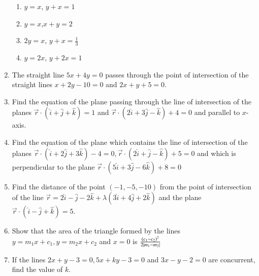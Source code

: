 \begin{enumerate}[label=\thesubsection.\arabic*,ref=\thesubsection.\theenumi]
\begin{enumerate}
\item $y=x$, $y+x=1$
\item $y=x$,$x+y=2$
\item $2y=x$, $y+x=\frac{1}{3}$
\item $y=2x$, $y+2x=1$
\end{enumerate}
\item The straight line $5x+4y=0$ passes through the point of intersection of the straight lines $x+2y-10=0$ and $2x+y+5=0$.
\item Find the equation of the plane passing through the line of intersection of the planes  $\overrightarrow{r}\cdot(\hat{i}+\hat{j}+\hat{k})=1$ and $\overrightarrow{r}\cdot(2\hat{i}+3\hat{j}-\hat{k})+4=0$ and parallel to $x$-axis.
\item Find the equation of the plane which contains the line of intersection of the planes $\overrightarrow{r}\cdot(\hat{i}+2\hat{j}+3\hat{k})-4=0, \overrightarrow{r} \cdot  (2\hat{i}+\hat{j}-\hat{k})+5=0$ and which is perpendicular to the plane $\overrightarrow{r}\cdot(5\hat{i}+3\hat{j}-6\hat{k})+8=0$
\item Find the distance of the point $(-1,-5,-10)$ from the point of intersection of the line $\overrightarrow{r}=2\hat{i}-\hat{j}-2\hat{k}+\lambda(3\hat{i}+4\hat{j}+2\hat{k})$ and the plane $\overrightarrow{r}\cdot(\hat{i}-\hat{j}+\hat{k})=5$.
\item Show that the area of the triangle formed by the lines $y=m_1x+c_1, y=m_2x+c_2$ and $x=0$ is $\frac{\left(c_1-c_2\right)^2}{2\left\vert m_1-m_2\right\vert}$
\item If the lines $2x+y-3=0, 5x+ky-3=0$ and $3x-y-2=0$ are concurrent, find the value of $k$.
\end{enumerate}
